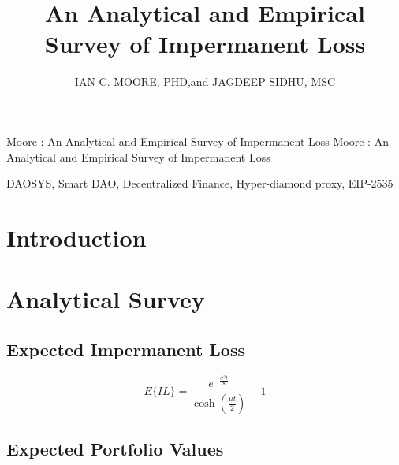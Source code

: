 \documentclass[journal,twocolumn,12pt]{ieeesyscoin}
\begin{document}
\history{}

\title{\centering An Analytical and Empirical Survey of Impermanent Loss}
\author{\centering \uppercase{Ian C. Moore, PhD},and
\uppercase{Jagdeep Sidhu, MSc}}

\address[1]{\centering  Syscoin Researcher, Syscoin Platform (e-mail: imoore@syscoin.org)}
\address[2]{\centering Syscoin Lead Developer, (e-mail: sidhujag@syscoin.org)}
\tfootnote{}

\markboth
{Moore \headeretal: An Analytical and Empirical Survey of Impermanent Loss}
{Moore \headeretal: An Analytical and Empirical Survey of Impermanent Loss}

\corresp{}

\begin{abstract}
\lipsum[1]
\end{abstract}

\begin{keywords}
DAOSYS, Smart DAO, Decentralized Finance, Hyper-diamond proxy, EIP-2535
\end{keywords}

\titlepgskip=-15pt

\maketitle

\section{Introduction}
\label{sec:introduction}

\lipsum[1]


\section{Analytical Survey}

\subsection{Expected Impermanent Loss}
\label{sec:exp_impermanent_loss}

\lipsum[1]

\begin{equation}\label{eqn:exp_imp_loss}
  E\{IL\} = \frac{e^{-\frac{\sigma^2 t}{8}}}{\cosh (\frac{\mu t}{2})} - 1
\end{equation}

\subsection{Expected Portfolio Values}
\label{sec:exp_portfolio_value}
\end{document}
